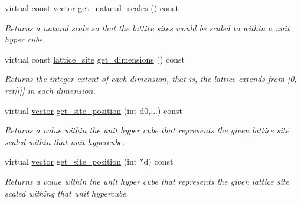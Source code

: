 \begin{DoxyCompactItemize}
\mbox{\label{classsisl_1_1body__centered__cubic_acff7112b5c40c548f1b693f087daeffb}} 
virtual const \hyperlink{namespacesisl_a2069bd5374a9be042ff3ce3306d41e1a}{vector} \hyperlink{classsisl_1_1body__centered__cubic_acff7112b5c40c548f1b693f087daeffb}{get\+\_\+natural\+\_\+scales} () const
\begin{DoxyCompactList}\small\item\em Returns a natural scale so that the lattice sites would be scaled to within a unit hyper cube. \end{DoxyCompactList}\item 
\mbox{\label{classsisl_1_1body__centered__cubic_a785d7bcf03ca3f6073d5d64c7dff8799}} 
virtual const \hyperlink{namespacesisl_acd18feee4026583db6185df2b25434aa}{lattice\+\_\+site} \hyperlink{classsisl_1_1body__centered__cubic_a785d7bcf03ca3f6073d5d64c7dff8799}{get\+\_\+dimensions} () const
\begin{DoxyCompactList}\small\item\em Returns the integer extent of each dimension, that is, the lattice extends from \mbox{[}0, ret\mbox{[}i\mbox{]}\mbox{]} in each dimension. \end{DoxyCompactList}\item 
\mbox{\label{classsisl_1_1body__centered__cubic_af853fa5d0bebb9e944a436777eb3570e}} 
virtual \hyperlink{namespacesisl_a2069bd5374a9be042ff3ce3306d41e1a}{vector} \hyperlink{classsisl_1_1body__centered__cubic_af853fa5d0bebb9e944a436777eb3570e}{get\+\_\+site\+\_\+position} (int d0,...) const
\begin{DoxyCompactList}\small\item\em Returns a value within the unit hyper cube that represents the given lattice site scaled within that unit hypercube. \end{DoxyCompactList}\item 
\mbox{\label{classsisl_1_1body__centered__cubic_a7f9420a1a443beb5cdd23289ad91f4de}} 
virtual \hyperlink{namespacesisl_a2069bd5374a9be042ff3ce3306d41e1a}{vector} \hyperlink{classsisl_1_1body__centered__cubic_a7f9420a1a443beb5cdd23289ad91f4de}{get\+\_\+site\+\_\+position} (int $\ast$d) const
\begin{DoxyCompactList}\small\item\em Returns a value within the unit hyper cube that represents the given lattice site scaled withing that unit hypercube. \end{DoxyCompactList}\item 

\end{DoxyCompactItemize}
